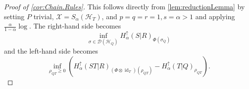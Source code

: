 \documentclass[11pt]{article}
\newcommand{\jk}[1]{\textcolor{cyan}{JK:~#1}}
\DeclareMathOperator{\id}{id}
\newcommand{\1}{\ensuremath{\mathbbm{1}}}
\theoremstyle{newdefinition}
\theoremstyle{newplain}
\newtheorem{corollary}[definition]{Corollary}
\newtheorem{remark}[definition]{Remark}
\theoremstyle{myplain}
\begin{document}
\begin{proof}[Proof of \cref{cor:Chain.Rules}]

\noindent This follows directly from \cref{lem:reductionLemma} by setting $P$ trivial, $\mathcal{X}=S_\alpha(\mathcal{H}_T)$, and $p=q=r=1, s=\alpha> 1$ and applying $\frac{\alpha}{1-\alpha}\log$. The right-hand side becomes $$\inf_{\sigma \in \mathcal{D}(\mathcal{H}_Q)}  H^{\uparrow}_\alpha(S|R)_{\Phi(\sigma_{Q})}$$ and the left-hand side becomes $$\inf_{\rho_{QT}\geq 0}\left(  H^{\uparrow}_\alpha(ST|R)_{(\Phi \otimes \id_T)(\rho_{QT})} - H^{\uparrow}_\alpha(T|Q)_{\rho_{QT}}\right).$$
\end{proof}

\end{document}
